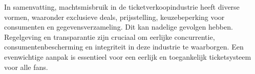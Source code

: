 \vspace{10 mm}
In samenvatting, machtsmisbruik in de ticketverkoopindustrie heeft diverse vormen, waaronder exclusieve deals, prijsstelling, keuzebeperking voor consumenten en gegevensverzameling. 
Dit kan nadelige gevolgen hebben. 
Regelgeving en transparantie zijn cruciaal om eerlijke concurrentie, consumentenbescherming en integriteit in deze industrie te waarborgen. 
Een evenwichtige aanpak is essentieel voor een eerlijk en toegankelijk ticketsysteem voor alle fans.
